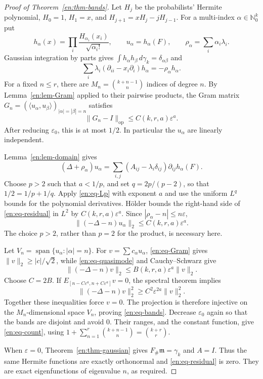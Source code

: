 \documentclass[12pt]{amsart}
\theoremstyle{definition}
\theoremstyle{remark}
\numberwithin{equation}{section}
\newcommand{\N}{\mathbb{N}}
\newcommand{\m}{\mathfrak m}
\theoremstyle{jpplain}
\begin{document}
\begin{proof}[Proof of Theorem~\ref{en:thm-bands}]
Let $H_j$ be the probabilists' Hermite polynomial,
$H_0=1$, $H_1=x$, and $H_{j+1}=xH_j-jH_{j-1}$.
For a multi-index $\alpha\in\N_0^k$ put
\[
 h_\alpha(x)=\prod_i\frac{H_{\alpha_i}(x_i)}{\sqrt{\alpha_i!}},
 \qquad u_\alpha=h_\alpha(F),\qquad
 \rho_\alpha=\sum_i\alpha_i\lambda_i.
\]
Gaussian integration by parts gives
$\int h_\alpha h_\beta\,d\gamma_k=\delta_{\alpha\beta}$ and
\[
 \sum_i\lambda_i(\partial_{ii}-x_i\partial_i)h_\alpha
 =-\rho_\alpha h_\alpha.
\]
For a fixed $n\leq r$, there are
$M_n=\binom{k+n-1}{n}$ indices of degree $n$.
By Lemma~\ref{en:lem-Gram} applied to their pairwise products, the Gram
matrix $G_n=(\langle u_\alpha,u_\beta\rangle)_{|\alpha|=|\beta|=n}$ satisfies
\begin{equation}\label{en:eq-Gram}
 \|G_n-I\|_{\mathrm{op}}\leq C(k,r,a)\varepsilon^a.
\end{equation}
After reducing $\varepsilon_0$, this is at most $1/2$.
In particular the $u_\alpha$ are linearly independent.

Lemma~\ref{en:lem-domain} gives
\begin{equation}\label{en:eq-residual}
 (\Delta+\rho_\alpha)u_\alpha
 =\sum_{i,j}(A_{ij}-\lambda_i\delta_{ij})
                   \partial_{ij}h_\alpha(F).
\end{equation}
Choose $p>2$ such that $a<1/p$, and set $q=2p/(p-2)$, so that
$1/2=1/p+1/q$.  Apply \eqref{en:eq-Lp} with exponent $a$ and use the
uniform $L^q$ bounds for the polynomial derivatives.  Hölder bounds the
right-hand side of \eqref{en:eq-residual} in $L^2$ by
$C(k,r,a)\varepsilon^a$.  Since $|\rho_\alpha-n|\leq n\varepsilon$,
\begin{equation}\label{en:eq-quasimode}
 \|(-\Delta-n)u_\alpha\|_2\leq C(k,r,a)\varepsilon^a.
\end{equation}
The choice $p>2$, rather than $p=2$ for the product, is necessary here.

Let $V_n=\operatorname{span}\{u_\alpha:|\alpha|=n\}$.  For
$v=\sum c_\alpha u_\alpha$, \eqref{en:eq-Gram} gives
$\|v\|_2\geq|c|/\sqrt2$, while \eqref{en:eq-quasimode} and
Cauchy--Schwarz give
\[
 \|(-\Delta-n)v\|_2\leq B(k,r,a)\varepsilon^a\|v\|_2.
\]
Choose $C=2B$.  If $E_{[n-C\varepsilon^a,n+C\varepsilon^a]}v=0$,
the spectral theorem implies
\[
 \|(-\Delta-n)v\|_2^2
 \geq C^2\varepsilon^{2a}\|v\|_2^2.
\]
Together these inequalities force $v=0$.  The projection is therefore
injective on the $M_n$-dimensional space $V_n$, proving
\eqref{en:eq-bands}.  Decrease $\varepsilon_0$ again so that the bands
are disjoint and avoid $0$.  Their ranges, and the constant function,
give \eqref{en:eq-count}, using
$1+\sum_{n=1}^r\binom{k+n-1}{n}=\binom{k+r}{r}$.

When $\varepsilon=0$, Theorem~\ref{en:thm-gaussian} gives $F_\#\m=\gamma_k$
and $A=I$.  Thus the same Hermite functions are exactly orthonormal and
\eqref{en:eq-residual} is zero.  They are exact eigenfunctions of eigenvalue
$n$, as required.
\end{proof}
\end{document}
